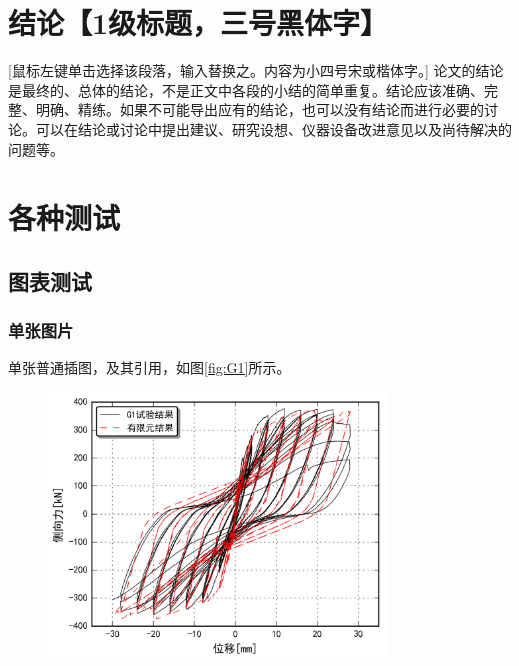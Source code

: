 \documentclass{bjtuthesis}
\begin{document}
\chapter{结论【1级标题，三号黑体字】 }
 [鼠标左键单击选择该段落，输入替换之。内容为小四号宋或楷体字。] 论文的结论是最终的、总体的结论，不是正文中各段的小结的简单重复。结论应该准确、完整、明确、精练。如果不可能导出应有的结论，也可以没有结论而进行必要的讨论。可以在结论或讨论中提出建议、研究设想、仪器设备改进意见以及尚待解决的问题等。

\chapter{各种测试}
\section{图表测试}
\subsection{单张图片}
单张普通插图，及其引用，如图\ref{fig:G1}所示。

\begin{figure}[!htp]
    \centering
    \includegraphics[width=0.8\textwidth]{pic/G1.png}
\end{figure}
\end{document}
